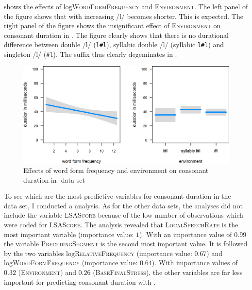  shows the effects of log\textsc{WordFormFrequency} and \textsc{Environment}.
The left panel of the figure shows that with increasing  /l/ becomes shorter. This is expected.
The right panel of the figure shows the insignificant effect of \textsc{Environment} on consonant duration in . The figure clearly shows that there is no durational difference between double /l/ (\texttt{l\#l}), syllabic double /l/ (syllabic \texttt{l\#l}) and singleton /l/ (\texttt{\#l}). The suffix  thus clearly degeminates in .


\begin{figure}
	\includegraphics[scale=.8] {images/Corpus/lyModelTransitionTypeAndFreq.png}
	\caption{Effects of word form frequency  and environment on consonant duration in -data set}
	\label{fig:corpus main effects  ly}
\end{figure}




To see which are the most predictive variables for consonant duration in the -data set, I conducted a  analysis. As for the other data sets, the analyses did not include the variable \textsc{LSAScore} because of the low number of observations which were coded for \textsc{LSAScore}. The analysis revealed that \textsc{LocalSpeechRate} is the most important variable (importance value: $1$). With an importance value of $0.99$ the variable \textsc{PrecedingSegment} is the second most important value. It is followed by the two  variables log\textsc{RelativeFre\-quency} (importance value: $0.67$) and log\textsc{WordFormFrequency} (importance val\-ue: $0.64$). With importance values of $0.32$ (\textsc{Environment}) and $0.26$ (\textsc{BaseFinal\-Stress}), the other variables are far less important for predicting consonant duration with .


